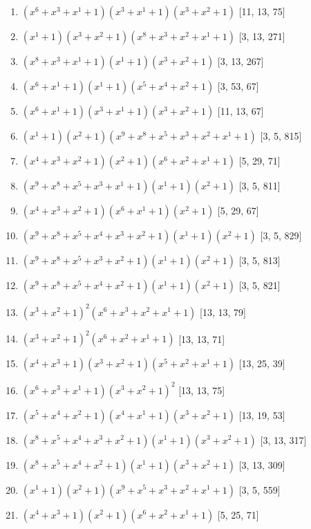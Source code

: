 \documentclass[10pt,twocolumn]{article}
\begin{document}
\begin{enumerate}
\item $(x^{6} + x^{3} + x^{1} + 1)(x^{3} + x^{1} + 1)(x^{3} + x^{2} + 1)$  [11, 13, 75]
\item $(x^{1} + 1)(x^{3} + x^{2} + 1)(x^{8} + x^{3} + x^{2} + x^{1} + 1)$  [3, 13, 271]
\item $(x^{8} + x^{3} + x^{1} + 1)(x^{1} + 1)(x^{3} + x^{2} + 1)$  [3, 13, 267]
\item $(x^{6} + x^{1} + 1)(x^{1} + 1)(x^{5} + x^{4} + x^{2} + 1)$  [3, 53, 67]
\item $(x^{6} + x^{1} + 1)(x^{3} + x^{1} + 1)(x^{3} + x^{2} + 1)$  [11, 13, 67]
\item $(x^{1} + 1)(x^{2} + 1)(x^{9} + x^{8} + x^{5} + x^{3} + x^{2} + x^{1} + 1)$  [3, 5, 815]
\item $(x^{4} + x^{3} + x^{2} + 1)(x^{2} + 1)(x^{6} + x^{2} + x^{1} + 1)$  [5, 29, 71]
\item $(x^{9} + x^{8} + x^{5} + x^{3} + x^{1} + 1)(x^{1} + 1)(x^{2} + 1)$  [3, 5, 811]
\item $(x^{4} + x^{3} + x^{2} + 1)(x^{6} + x^{1} + 1)(x^{2} + 1)$  [5, 29, 67]
\item $(x^{9} + x^{8} + x^{5} + x^{4} + x^{3} + x^{2} + 1)(x^{1} + 1)(x^{2} + 1)$  [3, 5, 829]
\item $(x^{9} + x^{8} + x^{5} + x^{3} + x^{2} + 1)(x^{1} + 1)(x^{2} + 1)$  [3, 5, 813]
\item $(x^{9} + x^{8} + x^{5} + x^{4} + x^{2} + 1)(x^{1} + 1)(x^{2} + 1)$  [3, 5, 821]
\item $(x^{3} + x^{2} + 1)^{2}(x^{6} + x^{3} + x^{2} + x^{1} + 1)$  [13, 13, 79]
\item $(x^{3} + x^{2} + 1)^{2}(x^{6} + x^{2} + x^{1} + 1)$  [13, 13, 71]
\item $(x^{4} + x^{3} + 1)(x^{3} + x^{2} + 1)(x^{5} + x^{2} + x^{1} + 1)$  [13, 25, 39]
\item $(x^{6} + x^{3} + x^{1} + 1)(x^{3} + x^{2} + 1)^{2}$  [13, 13, 75]
\item $(x^{5} + x^{4} + x^{2} + 1)(x^{4} + x^{1} + 1)(x^{3} + x^{2} + 1)$  [13, 19, 53]
\item $(x^{8} + x^{5} + x^{4} + x^{3} + x^{2} + 1)(x^{1} + 1)(x^{3} + x^{2} + 1)$  [3, 13, 317]
\item $(x^{8} + x^{5} + x^{4} + x^{2} + 1)(x^{1} + 1)(x^{3} + x^{2} + 1)$  [3, 13, 309]
\item $(x^{1} + 1)(x^{2} + 1)(x^{9} + x^{5} + x^{3} + x^{2} + x^{1} + 1)$  [3, 5, 559]
\item $(x^{4} + x^{3} + 1)(x^{2} + 1)(x^{6} + x^{2} + x^{1} + 1)$  [5, 25, 71]

\end{enumerate}
\end{document}
